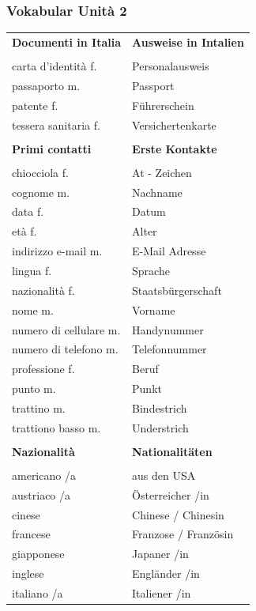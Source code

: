 \documentclass[10pt]{scrartcl}
\begin{document}
\begin{multicols*}{2}
\subsubsection*{Vokabular Unità 2}
\begin{supertabular}{p{4cm}p{4cm}}
\textbf{Documenti in Italia} & \textbf{Ausweise in Intalien} \\ 
\\
carta d'identità \hfill f. & Personalausweis\\
passaporto \hfill m. & Passport\\
patente \hfill f. & Führerschein\\
tessera sanitaria \hfill f. & Versichertenkarte\\
\\
\textbf{Primi contatti} & \textbf{Erste Kontakte} \\
\\
chiocciola \hfill f. & At - Zeichen\\
cognome \hfill m. & Nachname\\
data \hfill f. & Datum\\
età \hfill f. & Alter\\
indirizzo e-mail \hfill m. & E-Mail Adresse\\
lingua \hfill f. & Sprache\\
nazionalità \hfill f. & Staatsbürgerschaft\\
nome \hfill m. & Vorname\\
numero di cellulare \hfill m. & Handynummer\\
numero di telefono  \hfill m. & Telefonnummer\\
professione \hfill f. & Beruf\\
punto \hfill m. & Punkt\\
trattino \hfill m. & Bindestrich\\
trattiono basso \hfill m. & Understrich\\
\\
\textbf{Nazionalità} & \textbf{Nationalitäten} \\
\\
americano /a & aus den USA\\
austriaco /a & Österreicher /in\\
cinese & Chinese / Chinesin\\
francese & Franzose / Französin\\
giapponese & Japaner /in\\
inglese & Engländer /in\\
italiano /a & Italiener /in\\

\end{supertabular}
\end{multicols*}
\end{document}
